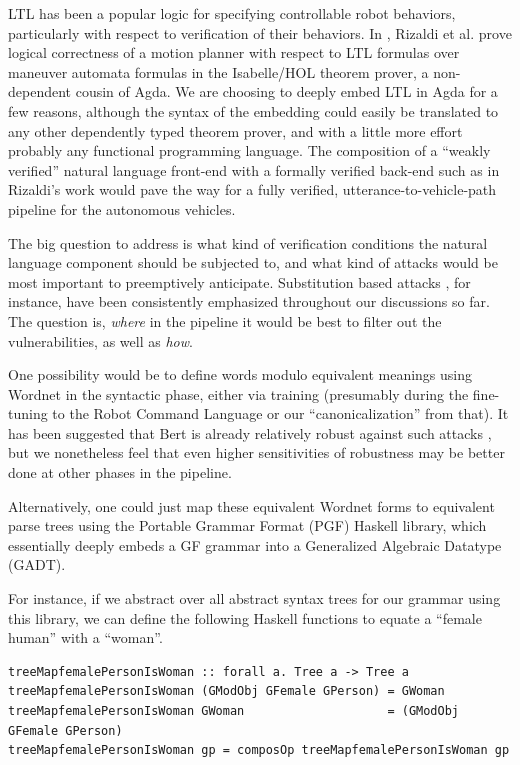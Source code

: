\documentclass[a4paper, 11pt]{article}
\begin{document}
LTL has been a popular logic for specifying controllable robot behaviors,
particularly with respect to verification of their behaviors. In
\cite{verifiedMotion}, Rizaldi et al. prove logical correctness of a motion
planner with respect to LTL formulas over maneuver automata formulas in the
Isabelle/HOL theorem prover, a non-dependent cousin of Agda. We are choosing to
deeply embed LTL in Agda for a few reasons, although the syntax of the embedding
could easily be translated to any other dependently typed theorem prover, and
with a little more effort probably any functional programming language. The
composition of a ``weakly verified'' natural language front-end with a formally
verified back-end such as in Rizaldi's work would pave the way for a fully
verified, utterance-to-vehicle-path pipeline for the autonomous vehicles.

The big question to address is what kind of verification conditions the natural
language component should be subjected to, and what kind of attacks would be
most important to preemptively anticipate. Substitution based attacks
\cite{substAttacks}, for instance, have been consistently emphasized throughout
our discussions so far. The question is, \emph{where} in the pipeline it would
be best to filter out the vulnerabilities, as well as \emph{how}.

One possibility would be to define words modulo equivalent meanings using
Wordnet \cite{wordnet} in the syntactic phase, either via training
\cite{ren-etal-2019-generating} (presumably during the fine-tuning to the Robot
Command Language or our ``canonicalization'' from that). It has been suggested
that Bert is already relatively robust against such attacks
\cite{hauser2021bert}, but we nonetheless feel that even higher sensitivities of
robustness may be better done at other phases in the pipeline.

Alternatively, one could just map these equivalent Wordnet forms to equivalent
parse trees using the Portable Grammar Format (PGF) Haskell library, which
essentially deeply embeds a GF grammar into a Generalized Algebraic Datatype
(GADT).

For instance, if we abstract over all abstract syntax trees for our grammar
using this library, we can define the following Haskell functions to equate a
``female human'' with a ``woman''. 

\begin{verbatim}
treeMapfemalePersonIsWoman :: forall a. Tree a -> Tree a
treeMapfemalePersonIsWoman (GModObj GFemale GPerson) = GWoman
treeMapfemalePersonIsWoman GWoman                    = (GModObj GFemale GPerson)
treeMapfemalePersonIsWoman gp = composOp treeMapfemalePersonIsWoman gp
\end{verbatim}
\end{document}
